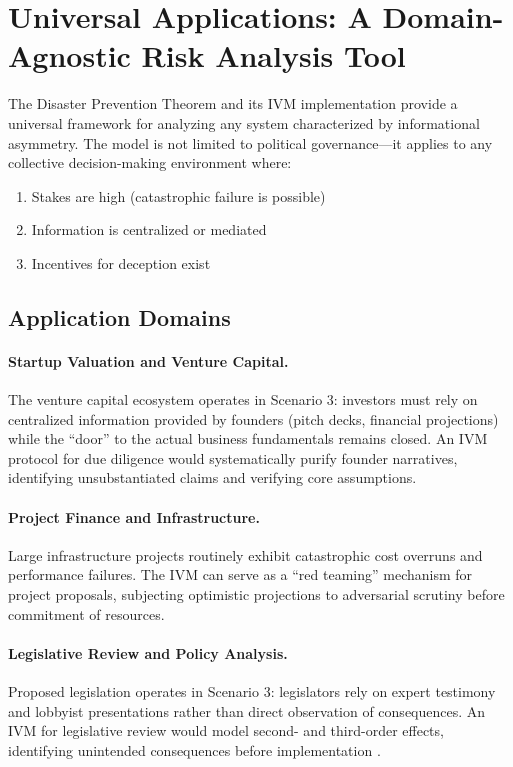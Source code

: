 \documentclass[11pt,a4paper]{article}
\begin{document}
\section{Universal Applications: A Domain-Agnostic Risk Analysis Tool}

The Disaster Prevention Theorem and its IVM implementation provide a universal framework for analyzing any system characterized by informational asymmetry. The model is not limited to political governance---it applies to any collective decision-making environment where:
\begin{enumerate}
    \item Stakes are high (catastrophic failure is possible)
    \item Information is centralized or mediated
    \item Incentives for deception exist
\end{enumerate}

\subsection{Application Domains}

\paragraph{Startup Valuation and Venture Capital.} The venture capital ecosystem operates in Scenario 3: investors must rely on centralized information provided by founders (pitch decks, financial projections) while the ``door'' to the actual business fundamentals remains closed. An IVM protocol for due diligence would systematically purify founder narratives, identifying unsubstantiated claims and verifying core assumptions.

\paragraph{Project Finance and Infrastructure.} Large infrastructure projects routinely exhibit catastrophic cost overruns and performance failures. The IVM can serve as a ``red teaming'' mechanism for project proposals, subjecting optimistic projections to adversarial scrutiny before commitment of resources.

\paragraph{Legislative Review and Policy Analysis.} Proposed legislation operates in Scenario 3: legislators rely on expert testimony and lobbyist presentations rather than direct observation of consequences. An IVM for legislative review would model second- and third-order effects, identifying unintended consequences before implementation \citep{Kovnatsky2025SVE5}.
\end{document}
